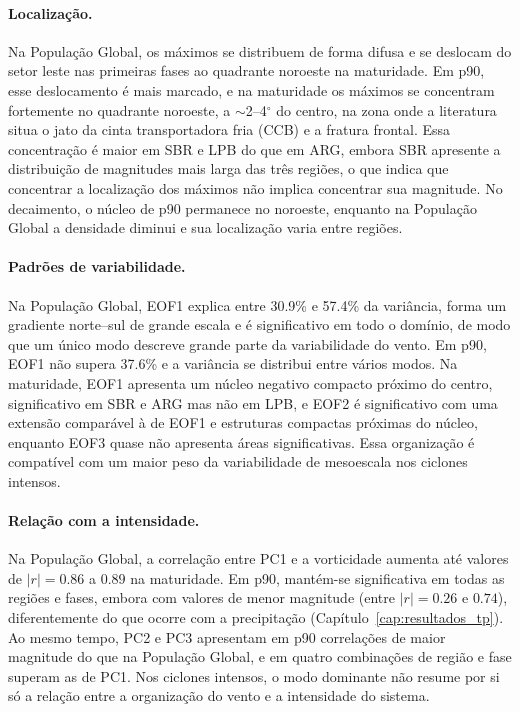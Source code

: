 \paragraph{Localização.}
Na População Global, os máximos se distribuem de forma difusa e se deslocam do setor leste nas primeiras fases ao quadrante noroeste na maturidade. Em p90, esse deslocamento é mais marcado, e na maturidade os máximos se concentram fortemente no quadrante noroeste, a ${\sim}$2--4$^{\circ}$ do centro, na zona onde a literatura situa o jato da cinta transportadora fria (CCB) e a fratura frontal. Essa concentração é maior em SBR e LPB do que em ARG, embora SBR apresente a distribuição de magnitudes mais larga das três regiões, o que indica que concentrar a localização dos máximos não implica concentrar sua magnitude. No decaimento, o núcleo de p90 permanece no noroeste, enquanto na População Global a densidade diminui e sua localização varia entre regiões.

\paragraph{Padrões de variabilidade.}
Na População Global, EOF1 explica entre 30.9\% e 57.4\% da variância, forma um gradiente norte--sul de grande escala e é significativo em todo o domínio, de modo que um único modo descreve grande parte da variabilidade do vento. Em p90, EOF1 não supera 37.6\% e a variância se distribui entre vários modos. Na maturidade, EOF1 apresenta um núcleo negativo compacto próximo do centro, significativo em SBR e ARG mas não em LPB, e EOF2 é significativo com uma extensão comparável à de EOF1 e estruturas compactas próximas do núcleo, enquanto EOF3 quase não apresenta áreas significativas. Essa organização é compatível com um maior peso da variabilidade de mesoescala nos ciclones intensos.

\paragraph{Relação com a intensidade.}
Na População Global, a correlação entre PC1 e a vorticidade aumenta até valores de $|r|=0.86$ a $0.89$ na maturidade. Em p90, mantém-se significativa em todas as regiões e fases, embora com valores de menor magnitude (entre $|r|=0.26$ e $0.74$), diferentemente do que ocorre com a precipitação (Capítulo~\ref{cap:resultados_tp}). Ao mesmo tempo, PC2 e PC3 apresentam em p90 correlações de maior magnitude do que na População Global, e em quatro combinações de região e fase superam as de PC1. Nos ciclones intensos, o modo dominante não resume por si só a relação entre a organização do vento e a intensidade do sistema.

